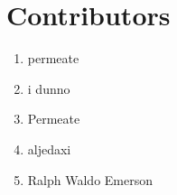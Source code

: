 \section{Contributors}
\begin{enumerate}
	\item permeate
	\item i dunno
	\item Permeate
	\item aljedaxi
	\item Ralph Waldo Emerson
\end{enumerate}